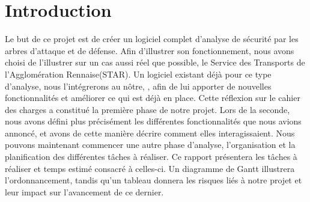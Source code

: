 \section{Introduction}
	\label{sec:intro}





	Le but de ce projet est de créer un logiciel complet d'analyse de sécurité par les arbres d'attaque et de défense. Afin d'illustrer son fonctionnement, nous avons choisi de l'illustrer sur un cas aussi réel que possible, le Service des Transports de l'Agglomération Rennaise(STAR). Un logiciel existant déjà pour ce type d'analyse, nous l'intégrerons au nôtre, \glasir{}, afin de lui apporter de nouvelles fonctionnalités et améliorer ce qui est déjà en place. Cette réflexion sur le cahier des charges a constitué la première phase de notre projet. Lors de la seconde, nous avons défini plus précisément les différentes fonctionnalités que nous avions annoncé, et avons de cette manière décrire comment elles interagissaient. Nous pouvons maintenant commencer une autre phase d'analyse, l'organisation et la planification des différentes tâches à réaliser. Ce rapport présentera les tâches à réaliser et temps estimé consacré à celles-ci. Un diagramme de Gantt illustrera l'ordonnancement, tandis qu'un tableau donnera les risques liés à notre projet et leur impact sur l'avancement de ce dernier.